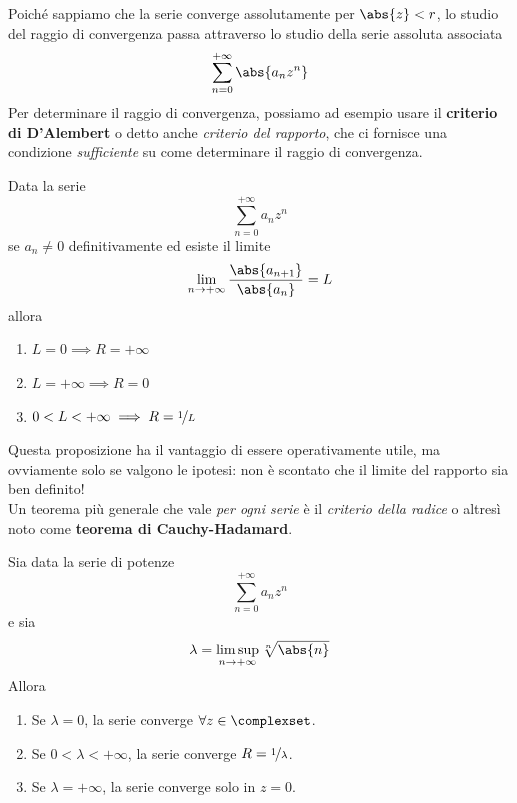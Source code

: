 Poiché sappiamo che la serie converge assolutamente per $\abs{z}<r$, lo studio del raggio di convergenza passa attraverso lo studio della serie assoluta associata
\begin{equation*}
	\sum_{n=0}^{+\infty}\abs{a_nz^n}
\end{equation*}
Per determinare il raggio di convergenza, possiamo ad esempio usare il \textbf{criterio di D’Alembert} o detto anche \textit{criterio del rapporto}, che ci fornisce una condizione \textit{sufficiente} su come determinare il raggio di convergenza.
\begin{propositionqed}
	Data la serie 
	\begin{equation*}
		\sum_{n=0}^{+\infty}a_nz^n
	\end{equation*}
	se $a_n\neq 0$ definitivamente ed esiste il limite
	\begin{equation*}
		\lim_{n\to+\infty}\frac{\abs{a_{n+1}}}{\abs{a_{n}}}=L
	\end{equation*}
	allora
	\begin{enumerate}
		\item $L=0\implies R=+\infty$
		\item $L=+\infty\implies R=0$
		\item $0<L<+\infty\implies R=\nicefrac{1}{L}$\qedhere
	\end{enumerate}
\end{propositionqed}
Questa proposizione ha il vantaggio di essere operativamente utile, ma ovviamente solo se valgono le ipotesi: non è scontato che il limite del rapporto sia ben definito!\\
Un teorema più generale che vale \textit{per ogni serie} è il \textit{criterio della radice} o altresì noto come \textbf{teorema di Cauchy-Hadamard}.
\begin{theorema}
	Sia data la serie di potenze
	\begin{equation*}
		\sum_{n=0}^{+\infty}a_nz^n
	\end{equation*}
	e sia
	\begin{equation}
		\lambda=\limsup_{n\to+\infty}\sqrt[n]{\abs{n}}
	\end{equation}
	Allora
	\begin{enumerate}
		\item Se $\lambda = 0$, la serie converge $\forall z\in\complexset$.
		\item Se $0<\lambda<+\infty$, la serie converge $R=\nicefrac{1}{\lambda}$.
		\item Se $\lambda = +\infty$, la serie converge solo in $z=0$.
	\end{enumerate}
\end{theorema}
